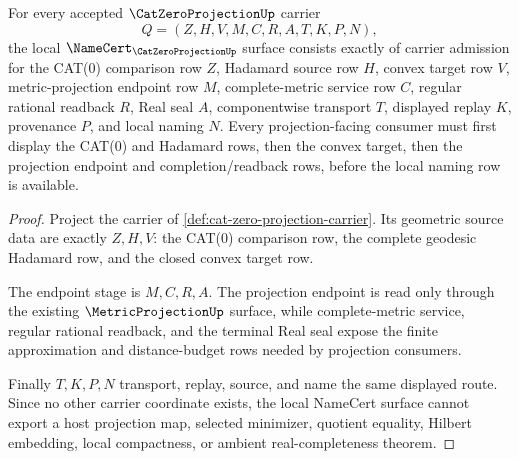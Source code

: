 \begin{theorem}
\label{thm:cat-zero-projection-namecert-obligations}
For every accepted $\CatZeroProjectionUp$ carrier
$$
Q=(Z,H,V,M,C,R,A,T,K,P,N),
$$
the local $\NameCert_{\CatZeroProjectionUp}$ surface consists exactly of carrier admission for the CAT(0) comparison row $Z$, Hadamard source row $H$, convex target row $V$, metric-projection endpoint row $M$, complete-metric service row $C$, regular rational readback $R$, Real seal $A$, componentwise transport $T$, displayed replay $K$, provenance $P$, and local naming $N$. Every projection-facing consumer must first display the CAT(0) and Hadamard rows, then the convex target, then the projection endpoint and completion/readback rows, before the local naming row is available.
\end{theorem}
\begin{proof}
Project the carrier of \autoref{def:cat-zero-projection-carrier}. Its geometric source data are exactly $Z,H,V$: the CAT(0) comparison row, the complete geodesic Hadamard row, and the closed convex target row.

The endpoint stage is $M,C,R,A$. The projection endpoint is read only through the existing $\MetricProjectionUp$ surface, while complete-metric service, regular rational readback, and the terminal Real seal expose the finite approximation and distance-budget rows needed by projection consumers.

Finally $T,K,P,N$ transport, replay, source, and name the same displayed route. Since no other carrier coordinate exists, the local NameCert surface cannot export a host projection map, selected minimizer, quotient equality, Hilbert embedding, local compactness, or ambient real-completeness theorem.
\end{proof}

